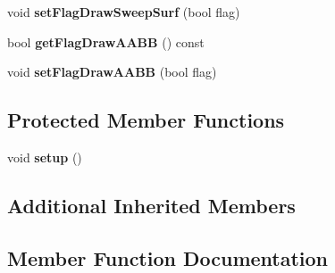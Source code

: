 \begin{DoxyCompactItemize}
\item 
\hypertarget{classps_1_1elastic_1_1CuttableMesh_a9da5ceded5ef7f2ecffb80f20a45dfa3}{}void {\bfseries set\+Flag\+Draw\+Sweep\+Surf} (bool flag)\label{classps_1_1elastic_1_1CuttableMesh_a9da5ceded5ef7f2ecffb80f20a45dfa3}

\item 
\hypertarget{classps_1_1elastic_1_1CuttableMesh_af8d9bfb7d00d9485c2f38a06aa768113}{}bool {\bfseries get\+Flag\+Draw\+A\+A\+B\+B} () const \label{classps_1_1elastic_1_1CuttableMesh_af8d9bfb7d00d9485c2f38a06aa768113}

\item 
\hypertarget{classps_1_1elastic_1_1CuttableMesh_abcdcebec31e9a88d2732e7e8f5cc32b7}{}void {\bfseries set\+Flag\+Draw\+A\+A\+B\+B} (bool flag)\label{classps_1_1elastic_1_1CuttableMesh_abcdcebec31e9a88d2732e7e8f5cc32b7}

\end{DoxyCompactItemize}
\subsection*{Protected Member Functions}
\begin{DoxyCompactItemize}
\item 
\hypertarget{classps_1_1elastic_1_1CuttableMesh_a00ee3e65bff52a11ec74d8a65db2adcb}{}void {\bfseries setup} ()\label{classps_1_1elastic_1_1CuttableMesh_a00ee3e65bff52a11ec74d8a65db2adcb}

\end{DoxyCompactItemize}
\subsection*{Additional Inherited Members}


\subsection{Member Function Documentation}
\hypertarget{classps_1_1elastic_1_1CuttableMesh_aee7462902722caff22b8ff0ea0ec8478}{}
